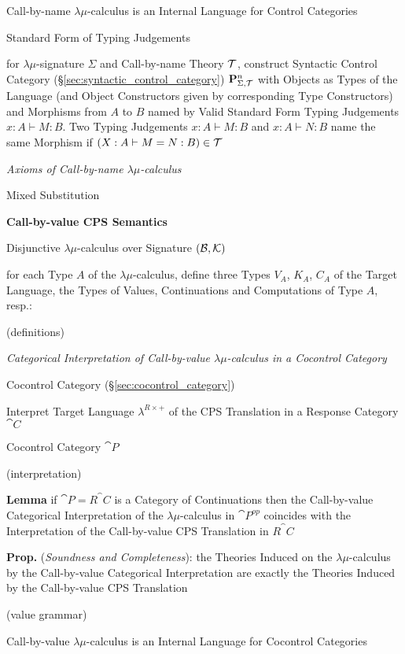 Call-by-name $\lambda\mu$-calculus is an Internal Language for Control
Categories


Standard Form of Typing Judgements %

for $\lambda\mu$-signature $\Sigma$ and Call-by-name Theory
$\mathcal{T}$, construct Syntactic Control Category
(\S\ref{sec:syntactic_control_category})
$\mathbf{P}^n_{\Sigma,\mathcal{T}}$ with Objects as Types of the Language
(and Object Constructors given by corresponding Type Constructors) and
Morphisms from $A$ to $B$ named by Valid Standard Form Typing
Judgements $x:A \vdash M:B$. Two Typing Judgements $x:A \vdash M:B$
and $x:A \vdash N:B$ name the same Morphism if $(X:A \vdash M=N:B) \in
\mathcal{T}$


\emph{Axioms of Call-by-name $\lambda\mu$-calculus} %

Mixed Substitution


\textbf{Call-by-value CPS Semantics}

Disjunctive $\lambda\mu$-calculus over Signature
$(\mathcal{B},\mathcal{K})$

for each Type $A$ of the $\lambda\mu$-calculus, define three Types
$V_A$, $K_A$, $C_A$ of the Target Language, the Types of Values,
Continuations and Computations of Type $A$, resp.:

(definitions) %

\emph{Categorical Interpretation of Call-by-value $\lambda\mu$-calculus
  in a Cocontrol Category}

Cocontrol Category (\S\ref{sec:cocontrol_category})

Interpret Target Language $\lambda^{R\times+}$ of the CPS Translation
in a Response Category $\cat{C}$

Cocontrol Category $\cat{P}$

(interpretation) %

\textbf{Lemma} if $\cat{P} = R^\cat{C}$ is a Category of Continuations
then the Call-by-value Categorical Interpretation of the
$\lambda\mu$-calculus in $\cat{P}^{op}$ coincides with the
Interpretation of the Call-by-value CPS Translation in $R^\cat{C}$

\textbf{Prop.} (\emph{Soundness and Completeness}): the Theories
Induced on the $\lambda\mu$-calculus by the Call-by-value Categorical
Interpretation are exactly the Theories Induced by the Call-by-value
CPS Translation

(value grammar) %

Call-by-value $\lambda\mu$-calculus is an Internal Language for
Cocontrol Categories

